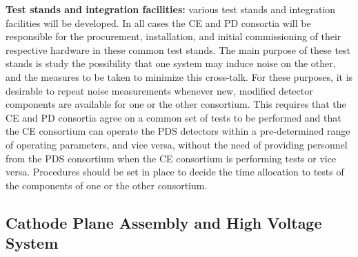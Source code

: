 \textbf{Test stands and integration facilities: }various test stands and integration facilities will be developed. In all cases the CE and PD consortia will be responsible for the procurement, installation, and initial commissioning of their respective hardware in these common test stands. The main purpose of these test stands is study the possibility that one system may induce noise on the other, and the measures to be taken to minimize this cross-talk. For these purposes, it is desirable to repeat noise measurements whenever new, modified detector components are available for one or the other consortium. This requires that the CE and PD consortia agree on a common set of tests to be performed and that the CE consortium can operate the PDS detectors within a pre-determined range of operating parameters, and vice versa, without the need of providing personnel from the PDS consortium when the CE consortium is performing tests or vice versa. Procedures should be set in place to decide the time allocation to tests of the components of one or the other consortium.


\subsection{Cathode Plane Assembly and High Voltage System}
\label{sec:fdsp-pd-intfc-le}


